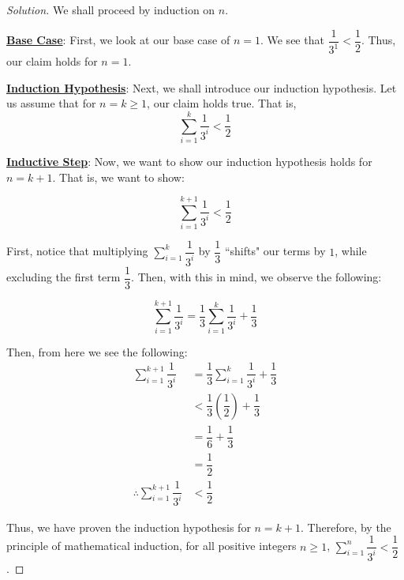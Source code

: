 \documentclass{article}
\newenvironment{solution}{\begin{proof}[Solution]}{\end{proof}}
\let\oldsum\sum
\renewcommand{\sum}[2]{\oldsum\limits_{#1}^{#2}}
\begin{document}
\begin{solution}
	We shall proceed by induction on $n$.
	
	\underline{\textbf{Base Case}}: First, we look at our base case of $n=1$. We see that $\dfrac{1}{3^{1}} < \dfrac{1}{2}$. Thus, our claim holds for $n=1$.
	
	\underline{\textbf{Induction Hypothesis}}: Next, we shall introduce our induction hypothesis. Let us assume that for $n=k \geq 1$, our claim holds true. That is,
	\begin{equation*}
		\sum{i=1}{k} \dfrac{1}{3^{i}} < \dfrac{1}{2}
	\end{equation*}

	\underline{\textbf{Inductive Step}}: Now, we want to show our induction hypothesis holds for $n=k+1$. That is, we want to show:
	
	\begin{equation*}
		\sum{i=1}{k+1} \dfrac{1}{3^{i}} < \dfrac{1}{2}
	\end{equation*}

	First, notice that multiplying $\sum{i=1}{k} \dfrac{1}{3^{i}}$ by $\dfrac{1}{3}$ ``shifts" our terms by $1$, while excluding the first term $\dfrac{1}{3}$. Then, with this in mind, we observe the following:
	
	\begin{equation*}
		\sum{i=1}{k+1} \dfrac{1}{3^{i}} = \dfrac{1}{3}\sum{i=1}{k} \dfrac{1}{3^{i}} + \dfrac{1}{3}
	\end{equation*}

	Then, from here we see the following:
	\begin{align*}
		\sum{i=1}{k+1} \dfrac{1}{3^{i}} &= \dfrac{1}{3}\sum{i=1}{k} \dfrac{1}{3^{i}} + \dfrac{1}{3} \\
		&< \dfrac{1}{3}\left( \dfrac{1}{2} \right) + \dfrac{1}{3} \tag{by our induction hypothesis} \\
		&= \dfrac{1}{6} + \dfrac{1}{3} \\
		&= \dfrac{1}{2} \\
		\therefore\sum{i=1}{k+1} \dfrac{1}{3^{i}} &< \dfrac{1}{2}
	\end{align*}

	Thus, we have proven the induction hypothesis for $n=k+1$. Therefore, by the principle of mathematical induction, for all positive integers $n \geq 1$, $\sum{i=1}{n} \dfrac{1}{3^{i}} < \dfrac{1}{2}$.
\end{solution}

\newpage
\end{document}
